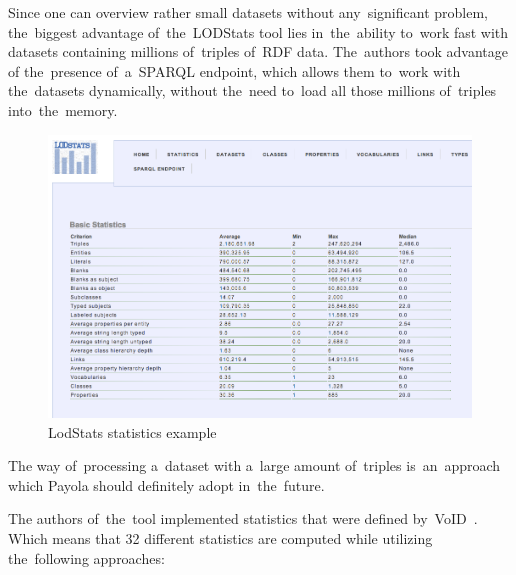 Since one can overview rather small datasets without any~significant problem, 
the~biggest advantage of~the~LODStats tool lies in~the~ability to~work fast with 
datasets containing millions of~triples of~RDF data. The~authors took advantage 
of the~presence of~a~SPARQL endpoint, which allows them to~work with the~datasets 
dynamically, without the~need to~load all those millions of~triples into~the~memory.


\begin{figure}
	\centering
	\includegraphics[width=140mm]{img/lodstats.png}
	\caption{LodStats statistics example}
	\label{fig:lodstats}
\end{figure}

The way of~processing a~dataset with a~large amount of~triples is~an~approach 
which Payola should definitely adopt in~the~future.

The authors of~the~tool implemented statistics that were defined by~VoID~\cite{void}. Which 
means that 32 different statistics are computed while utilizing the~following 
approaches:

